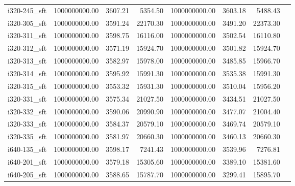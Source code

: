\begin{tabular}{llrrrrrr}
i320-245\_sft &           1000000000.00 &                     3607.21 &               5354.50 &    1000000000.00 &              3603.18 &        5488.43 \\
i320-305\_sft &           1000000000.00 &                     3591.24 &              22170.30 &    1000000000.00 &              3491.20 &       22373.30 \\
i320-311\_sft &           1000000000.00 &                     3598.75 &              16116.00 &    1000000000.00 &              3502.54 &       16110.80 \\
i320-312\_sft &           1000000000.00 &                     3571.19 &              15924.70 &    1000000000.00 &              3501.82 &       15924.70 \\
i320-313\_sft &           1000000000.00 &                     3582.97 &              15978.00 &    1000000000.00 &              3485.85 &       15966.70 \\
i320-314\_sft &           1000000000.00 &                     3595.92 &              15991.30 &    1000000000.00 &              3535.38 &       15991.30 \\
i320-315\_sft &           1000000000.00 &                     3553.32 &              15931.30 &    1000000000.00 &              3510.04 &       15956.20 \\
i320-331\_sft &           1000000000.00 &                     3575.34 &              21027.50 &    1000000000.00 &              3434.51 &       21027.50 \\
i320-332\_sft &           1000000000.00 &                     3590.06 &              20990.90 &    1000000000.00 &              3477.07 &       21004.40 \\
i320-333\_sft &           1000000000.00 &                     3584.37 &              20579.10 &    1000000000.00 &              3469.74 &       20579.10 \\
i320-335\_sft &           1000000000.00 &                     3581.97 &              20660.30 &    1000000000.00 &              3460.13 &       20660.30 \\
i640-135\_sft &           1000000000.00 &                     3598.17 &               7241.43 &    1000000000.00 &              3539.96 &        7276.81 \\
i640-201\_sft &           1000000000.00 &                     3579.18 &              15305.60 &    1000000000.00 &              3389.10 &       15381.60 \\
i640-205\_sft &           1000000000.00 &                     3588.65 &              15787.70 &    1000000000.00 &              3299.41 &       15895.70 \\

\end{tabular}
